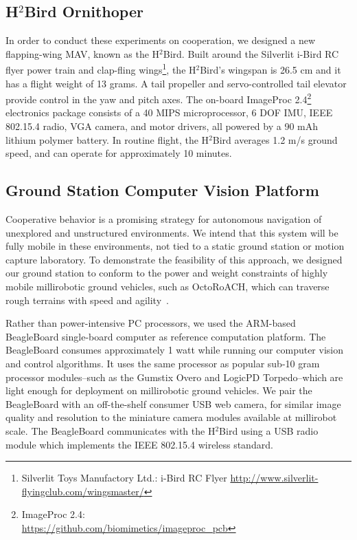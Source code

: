 \documentclass{aamas2013}
\begin{document}
\subsection{H$^2$Bird Ornithoper}
In order to conduct these experiments on cooperation, we designed a new
flapping-wing MAV, known as the H$^2$Bird. Built around the Silverlit i-Bird 
RC flyer power train and clap-fling 
wings\footnote{\raggedright Silverlit Toys Manufactory Ltd.: i-Bird RC Flyer
\href{http://www.silverlit-flyingclub.com/wingsmaster/}
     {http://www.silverlit-flyingclub.com/wingsmaster/}}, 
the H$^2$Bird's wingspan is 26.5 cm and it has a flight weight of 13 grams. A 
tail propeller and servo-controlled tail elevator provide control in the yaw 
and pitch axes. The on-board ImageProc 2.4\footnote{ImageProc 2.4: \\
\href{https://github.com/biomimetics/imageproc\_pcb}
     {https://github.com/biomimetics/imageproc\_pcb}} 
electronics package consists of a 40 MIPS microprocessor, 6 DOF IMU, 
IEEE 802.15.4 radio, VGA camera, and motor drivers, all powered by a 90 mAh 
lithium polymer battery. In routine flight, the H$^2$Bird averages 1.2 m/s 
ground speed, and can operate for approximately 10 minutes.

\subsection{Ground Station Computer Vision Platform}
Cooperative behavior is a promising strategy for autonomous navigation of 
unexplored and unstructured environments. We intend that this system will be 
fully mobile in these environments, not tied to a static ground station or 
motion capture laboratory. To demonstrate the feasibility of this approach, 
we designed our ground station to conform to the power and weight 
constraints of highly mobile millirobotic ground vehicles, such as 
OctoRoACH, which can traverse rough terrains with speed and agility~\cite{Pullin2012Dynamic}. 

Rather than power-intensive PC processors, we used the ARM-based 
BeagleBoard single-board computer as reference computation platform. The
BeagleBoard consumes approximately 1 watt while running our computer vision 
and control algorithms. It uses the same processor as popular sub-10 gram 
processor modules--such as the Gumstix Overo and LogicPD Torpedo--which are 
light enough for deployment on millirobotic ground vehicles. We pair the 
BeagleBoard with an off-the-shelf consumer USB web camera, for similar image 
quality and resolution to the miniature camera modules available at 
millirobot scale. The BeagleBoard communicates with the H$^2$Bird using a 
USB radio module which implements the IEEE 802.15.4 wireless standard.
\end{document}
